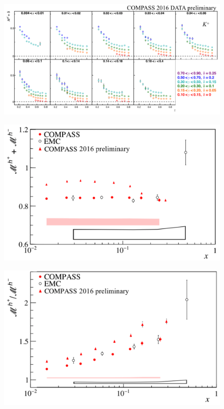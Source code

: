 \documentclass[letterpaper,12pt]{article}
\begin{document}
\newpage

\begin{figure}
	\includegraphics[scale=0.5]{./gfx/Km.png}
	\caption{}
	\label{Km}
\end{figure}

\newpage

\begin{figure}[H]
	\includegraphics[scale=0.38]{./gfx/hs.png}
	\caption{}
	\label{hs}
\end{figure}

\begin{figure}[H]
	\includegraphics[scale=0.38]{./gfx/hr.png}
	\caption{}
	\label{hr}
\end{figure}
\end{document}

